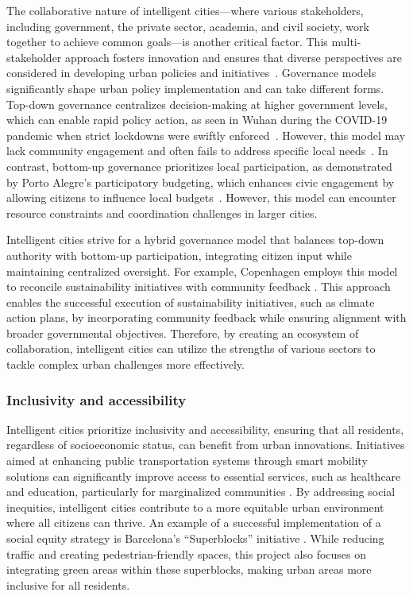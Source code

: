 \documentclass[smartcities,article,submit,pdftex,moreauthors]{Definitions/mdpi}
\begin{document}
The collaborative nature of intelligent cities—where various stakeholders, including government, the private sector, academia, and civil society, work together to achieve common goals—is another critical factor. This multi-stakeholder approach fosters innovation and ensures that diverse perspectives are considered in developing urban policies and initiatives~\cite{GenderEquitySC}. Governance models significantly shape urban policy implementation and can take different forms. Top-down governance centralizes decision-making at higher government levels, which can enable rapid policy action, as seen in Wuhan during the COVID-19 pandemic when strict lockdowns were swiftly enforced~\cite{TopDownGov1}. However, this model may lack community engagement and often fails to address specific local needs~\cite{GenderEquitySC}. In contrast, bottom-up governance prioritizes local participation, as demonstrated by Porto Alegre's participatory budgeting, which enhances civic engagement by allowing citizens to influence local budgets~\cite{ParticipatoryBudgeting}. However, this model can encounter resource constraints and coordination challenges in larger cities. 

Intelligent cities strive for a hybrid governance model that balances top-down authority with bottom-up participation, integrating citizen input while maintaining centralized oversight. For example, Copenhagen employs this model to reconcile sustainability initiatives with community feedback 
\cite{CitizenParticipation, SCStakeholders}. This approach enables the successful execution of sustainability initiatives, such as climate action plans, by incorporating community feedback while ensuring alignment with broader governmental objectives. Therefore, by creating an ecosystem of collaboration, intelligent cities can utilize the strengths of various sectors to tackle complex urban challenges more effectively. 

\subsubsection{Inclusivity and accessibility}

Intelligent cities prioritize inclusivity and accessibility, ensuring that all residents, regardless of socioeconomic status, can benefit from urban innovations. Initiatives aimed at enhancing public transportation systems through smart mobility solutions can significantly improve access to essential services, such as healthcare and education, particularly for marginalized communities 
\cite{SCStakeholders}. By addressing social inequities, intelligent cities contribute to a more equitable urban environment where all citizens can thrive. An example of a successful implementation of a social equity strategy is Barcelona's ``Superblocks'' initiative 
\cite{BarcelonaSuperblocks}. While reducing traffic and creating pedestrian-friendly spaces, this project also focuses on integrating green areas within these superblocks, making urban areas more inclusive for all residents.
\end{document}
